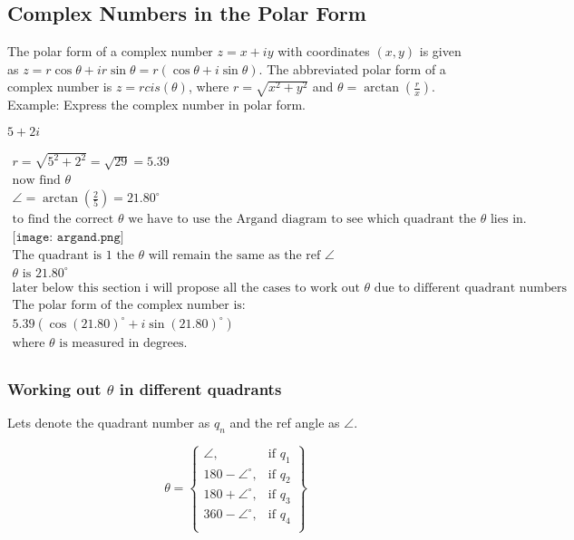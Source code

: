\subsection{Complex Numbers in the Polar Form}

The polar form of a complex number $z = x + iy$ with coordinates $(x, y)$ is given as $z = r\cos{\theta} + ir\sin{\theta} = r(\cos{\theta}+i\sin{\theta})$. The abbreviated polar form of a complex number is $z = rcis(\theta)$, where $r = \sqrt{x^{2}+y^{2}}$ and $\theta = \arctan{(\frac{r}{x})}$. \\

Example: Express the complex number in polar form.

$5+2i$

\begin{equation}
    \begin{split}
        r = \sqrt{5^2+2^2} = \sqrt{29} = 5.39 \\
        \text{now find $\theta$} \\ 
        \angle = \arctan{(\frac{2}{5})}  = 21.80^{\circ} \\ 
        \text{to find the correct $\theta$ we have to use the Argand diagram to see which quadrant the $\theta$ lies in.} \\
        \texttt{[image: argand.png]} \\
        \text{The quadrant is $1$ the $\theta$ will remain the same as the ref $\angle$} \\
        \text{$\theta$ is $21.80^{\circ}$} \\
        \text{later below this section i will propose all the cases to work out $\theta$ due to different quadrant numbers} \\
        \text{The polar form of the complex number is:} \\
        5.39(\cos{(21.80)^{\circ}}+i\sin{(21.80)^{\circ}}) \\        
        \text{where $\theta$ is measured in degrees.} \\
    \end{split}
\end{equation}

\subsubsection{Working out $\theta$ in different quadrants}

Lets denote the quadrant number as $q_{n}$ and the ref angle as $\angle$.

\begin{equation}
    \theta =
    \left\{
        \begin{array}{lr}
            \angle, & \text{if } q_{1}\\
            180-\angle^{\circ}, & \text{if } q_{2} \\
            180+\angle^{\circ}, & \text{if } q_{3} \\
            360-\angle^{\circ}, & \text{if } q_{4} \\                        
        \end{array}
    \right\} 
\end{equation}